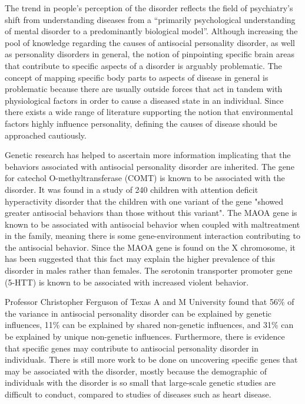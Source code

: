 The trend in people's perception of the disorder reflects the field of psychiatry's shift from understanding diseases from a “primarily psychological understanding of mental disorder to a predominantly biological model”. \cite{pickersgill}Although increasing the pool of knowledge regarding the causes of antisocial personality disorder, as well as personality disorders in general, the notion of pinpointing specific brain areas that contribute to specific aspects of a disorder is arguably problematic. The concept of mapping specific body parts to aspects of disease in general is problematic because there are usually outside forces that act in tandem with physiological factors in order to cause a diseased state in an individual. Since there exists a wide range of literature supporting the notion that environmental factors highly influence personality, defining the causes of disease should be approached cautiously. 
	
Genetic research has helped to ascertain more information implicating that the behaviors associated with antisocial personality disorder are inherited.   The gene for catechol O-methyltransferase (COMT) is known to be associated with the disorder. It was found in a study of 240 children with attention deficit hyperactivity disorder that the children with one variant of the gene "showed greater antisocial behaviors than those without this variant". \cite{ferguson} The MAOA gene is known to be associated with antisocial behavior when coupled with maltreatment in the family, meaning there is some gene-environment interaction contributing to the antisocial behavior. Since the MAOA gene is found on the X chromosome, it has been suggested that this fact may explain the higher prevalence of this disorder in males rather than females. \cite{ferguson}  The serotonin transporter promoter gene (5-HTT) is known to be associated with increased violent behavior. 

Professor Christopher Ferguson of Texas A and M University found that 56\% of the variance in antisocial personality disorder can be explained by genetic influences, 11\% can be explained by shared non-genetic influences, and 31\% can be explained by unique non-genetic influences. \cite{ferguson} Furthermore, there is evidence that specific genes may contribute to antisocial personality disorder in individuals.  There is still more work to be done on uncovering specific genes that may be associated with the disorder, mostly because the demographic of individuals with the disorder is so small that large-scale genetic studies are difficult to conduct, compared to studies of diseases such as heart disease. 
	
